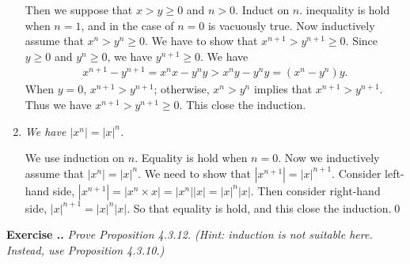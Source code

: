 \documentclass{book}
\newcounter{Exercise}[section]
\renewcommand{\theExercise}{\thesection.\arabic{Exercise}.}
\newcommand{\new}{\vspace{1.5em}\noindent\textbf{{Exercise \stepcounter{Exercise}\textbf{\theExercise}}} }
\begin{document}
\begin{enumerate}
    Then we suppose that $x>y\geq 0$ and $n>0$. Induct on $n$. inequality is hold when $n=1$, and in the case of $n=0$ is vacuously true. Now inductively assume that $x^n>y^n\geq 0$. We have to show that $x^{n+1}>y^{n+1}\geq 0$. Since $y\geq 0$ and $y^n\geq 0$, we have $y^{n+1}\geq 0$. We have
       \begin{align*}
        x^{n+1}-y^{n+1}=x^nx-y^ny>x^ny-y^ny
        =(x^n-y^n)y.
       \end{align*}
    When $y=0$, $x^{n+1}>y^{n+1}$; otherwise, $x^n>y^n$ implies that $x^{n+1}>y^{n+1}$. Thus we have $x^{n+1}>y^{n+1}\geq 0$. This close the induction.

    \item \emph{We have $|x^n|=|x|^n$.}

    We use induction on $n$. Equality is hold when $n=0$. Now we inductively assume that $|x^n|=|x|^n$. We need to show that $|x^{n+1}|=|x|^{n+1}$. Consider left-hand side, $|x^{n+1}|=|x^n\times x|=|x^n||x|=|x|^n|x|$. Then consider right-hand side, $|x|^{n+1}=|x|^n|x|$. So that equality is hold, and this close the induction.\qed
\end{enumerate}

\new\emph{Prove Proposition 4.3.12. (Hint: induction is not suitable here. Instead, use Proposition 4.3.10.)}
\end{document}
